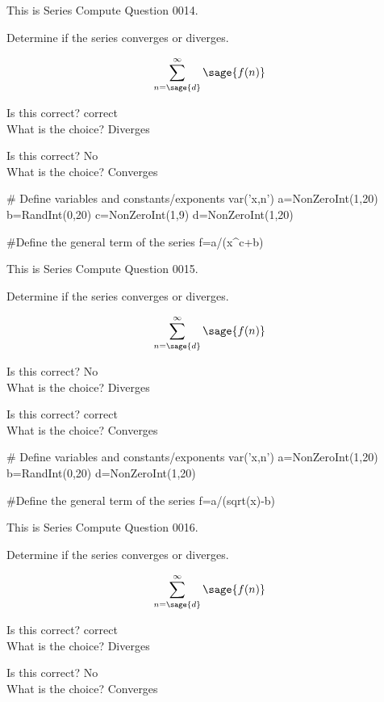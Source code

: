 \documentclass{ximera}
\renewcommand{\latexProblemContent}[1]{#1}
\renewcommand{\choice}[2][No]{\item Is this correct? #1 \\ What is the choice? #2}
\begin{document}
\latexProblemContent{
\ifVerboseLocation This is Series Compute Question 0014. \\ \fi
\begin{problem}
Determine if the series converges or diverges.  

\[\sum_{n=\sage{d}}^\infty \sage{f(n)}\]



\begin{multipleChoice}
\choice[correct]{Diverges}
\choice{Converges}
\end{multipleChoice}

\end{problem}}%

\begin{sagesilent}
# Define variables and constants/exponents
var('x,n')
a=NonZeroInt(1,20)
b=RandInt(0,20)
c=NonZeroInt(1,9)
d=NonZeroInt(1,20)

#Define the general term of the series
f=a/(x^c+b)

\end{sagesilent}

\latexProblemContent{
\ifVerboseLocation This is Series Compute Question 0015. \\ \fi
\begin{problem}
Determine if the series converges or diverges.  

\[\sum_{n=\sage{d}}^\infty \sage{f(n)}\]



\begin{multipleChoice}
\choice{Diverges}
\choice[correct]{Converges}
\end{multipleChoice}

\end{problem}}%

\begin{sagesilent}
# Define variables and constants/exponents
var('x,n')
a=NonZeroInt(1,20)
b=RandInt(0,20)
d=NonZeroInt(1,20)

#Define the general term of the series
f=a/(sqrt(x)-b)

\end{sagesilent}

\latexProblemContent{
\ifVerboseLocation This is Series Compute Question 0016. \\ \fi
\begin{problem}
Determine if the series converges or diverges.  

\[\sum_{n=\sage{d}}^\infty \sage{f(n)}\]



\begin{multipleChoice}
\choice[correct]{Diverges}
\choice{Converges}
\end{multipleChoice}

\end{problem}}%
\end{document}
